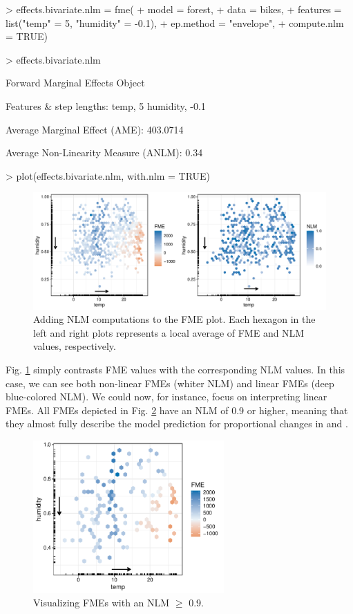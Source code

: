 \begin{example}
> effects.bivariate.nlm = fme(
+   model = forest,
+   data = bikes,
+   features = list("temp" = 5, "humidity" = -0.1),
+   ep.method = "envelope",
+   compute.nlm = TRUE)

> effects.bivariate.nlm

Forward Marginal Effects Object

Features & step lengths:
  temp, 5
  humidity, -0.1

Average Marginal Effect (AME):
  403.0714

Average Non-Linearity Measure (ANLM):
  0.34 

> plot(effects.bivariate.nlm, with.nlm = TRUE)
\end{example}
\begin{figure}[H]
    \centering
    \includegraphics[width = \textwidth]{figures/pbiv_nlm.pdf}
    \caption{Adding NLM computations to the FME plot. Each hexagon in the left and right plots represents a local average of FME and NLM values, respectively.
    }
    \label{fig:fme_nlm}
\end{figure}
Fig. \ref{fig:fme_nlm} simply contrasts FME values with the corresponding NLM values. In this case, we can see both non-linear FMEs (whiter NLM) and linear FMEs (deep blue-colored NLM). We could now, for instance, focus on interpreting linear FMEs. All FMEs depicted in Fig. \ref{fig:linear_fme_bivariate} have an NLM of 0.9 or higher, meaning that they almost fully describe the model prediction for proportional changes in  and .
\begin{figure}[H]
    \centering
    \includegraphics[width = 0.65\textwidth]{figures/linear_fme_bivariate.pdf}
    \caption{Visualizing FMEs with an NLM $\geq$ 0.9.}
    \label{fig:linear_fme_bivariate}
\end{figure}
